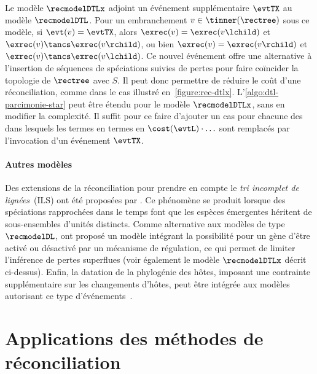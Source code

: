 {Le modèle \(\recmodelDTLx\) adjoint un événement supplémentaire \(\evtTX\) au modèle \(\recmodelDTL\).
Pour un embranchement \(v \in \tinner(\rectree)\) sous ce modèle, si \(\evt(v) = \evtTX\), alors \(\exrec(v) = \exrec(v\lchild)\) et \(\exrec(v) \tancs \exrec(v\rchild)\), ou bien \(\exrec(v) = \exrec(v\rchild)\) et \(\exrec(v) \tancs \exrec(v\lchild)\).
Ce nouvel événement offre une alternative à l’insertion de séquences de spéciations suivies de pertes pour faire coïncider la topologie de \(\rectree\) avec \(S\).
Il peut donc permettre de réduire le coût d’une réconciliation, comme dans le cas illustré en~\cref{figure:rec-dtlx}.
L’\cref{algo:dtl-parcimonie-star} peut être étendu pour le modèle \(\recmodelDTLx\), sans en modifier la complexité.
Il suffit pour ce faire d’ajouter un cas pour chacune des  dans lesquels les termes en termes en \(\cost(\evtL) \cdot \hdots\) sont remplacés par l’invocation d’un événement \(\evtTX\).

\paragraph{Autres modèles}
Des extensions de la réconciliation pour prendre en compte le \emph{tri incomplet de lignées}~(ILS) ont été proposées par \textcite{Rasmussen2012UnifiedModelingGene,Wu2013MostParsimoniousReconciliation,Chan2017InferringIncompleteLineage}.
Ce phénomène se produit lorsque des spéciations rapprochées dans le temps font que les espèces émergentes héritent de sous-ensembles d’unités distincts.
Comme alternative aux modèles de type \(\recmodelDL\), \textcite{Goodman1979FittingGeneLineage} ont proposé un modèle intégrant la possibilité pour un gène d’être activé ou désactivé par un mécanisme de régulation, ce qui permet de limiter l’inférence de pertes superflues (voir également le modèle \(\recmodelDTLx\) décrit ci-dessus).
Enfin, la datation de la phylogénie des hôtes, imposant une contrainte supplémentaire sur les changements d’hôtes, peut être intégrée aux modèles autorisant ce type d’événements~\parencite{Tofigh2011SimultaneousIdentificationDuplications}.

\section{Applications des méthodes de réconciliation}

}
